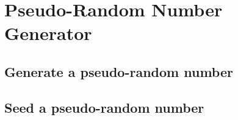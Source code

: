 \chapter{Pseudo-Random Number Generator}

\section{Generate a pseudo-random number}

\section{Seed a pseudo-random number}